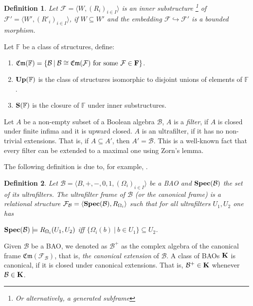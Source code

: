 \documentclass[a4paper]{article}
\theoremstyle{defin}
\newtheorem{defin}{Definition}
\theoremstyle{theorem}
\theoremstyle{prop}
\theoremstyle{lemma}
\theoremstyle{fact}
\theoremstyle{ex}
\theoremstyle{col}
\begin{document}
\begin{defin} Let $\mathcal{F} = \langle W, (R_{i})_{i \in I} \rangle$ is an inner substructure \footnote{Or alternatively, a generated subframe} of $\mathcal{F}' = \langle W', ({R'}_{i})_{i \in I} \rangle$, if $W \subseteq W'$ and the embedding $\mathcal{F} \hookrightarrow \mathcal{F}'$ is a bounded morphism.
\end{defin}

Let $\mathbb{F}$ be a class of structures, define:
\begin{enumerate}
\item $\mathfrak{Cm}(\mathbb{F}) = \{ \mathcal{B} \: | \: \mathcal{B} \cong \mathfrak{Cm}(\mathcal{F}) \text{ for some $\mathcal{F} \in {\bf F}$}\}$.
\item ${\bf Up}(\mathbb{F})$ is the class of structures isomorphic to disjoint unions of elements of $\mathbb{F}$.
\item ${\bf S}(\mathbb{F})$ is the closure of $\mathbb{F}$ under inner substructures.
\end{enumerate}

Let $A$ be a non-empty subset of a Boolean algebra $\mathcal{B}$, $A$ is a \emph{filter}, if $A$ is closed under finite infima and it is upward closed. $A$ is an ultrafilter, if it has no non-trivial extensions. That is, if $A \subseteq A'$, then $A' = \mathcal{B}$. This is a well-known fact that every filter can be extended to a maximal one using Zorn's lemma.

The following definition is due to, for example, \cite[Definition 5.40]{venema2010}.

\begin{defin}
  Let $\mathcal{B} = \langle B, +, -, 0, 1, (\Omega_i)_{i \in I} \rangle$ be a BAO and ${\bf Spec}(\mathcal{B})$ the set of its ultrafilters. The ultrafilter frame of $\mathcal{B}$ (or the canonical frame) is a relational structure $\mathcal{F}_{\mathcal{B}} = \langle {\bf Spec}(\mathcal{B}), R_{\Omega_i} \rangle$ such that for all ultrafilters $U_1, U_2$ one has
  \begin{center}
    ${\bf Spec}(\mathcal{B}) \models R_{\Omega_i}(U_1, U_2)$ iff $\{ \Omega_i(b) \: | \: b \in U_1 \} \subseteq U_2$.
  \end{center}
\end{defin}

Given $\mathcal{B}$ be a BAO, we denoted as $\mathcal{B}^{+}$ as the complex algebra of the canonical frame $\mathfrak{Cm}(\mathcal{F}_{\mathcal{B}})$, that is, \emph{the canonical extension} of $\mathcal{B}$.
A class of BAOs ${\bf K}$ is canonical, if it is closed under canonical extensions. That is, $\mathcal{B}^{+} \in {\bf K}$ whenever $\mathcal{B} \in {\bf K}$.
\end{document}
